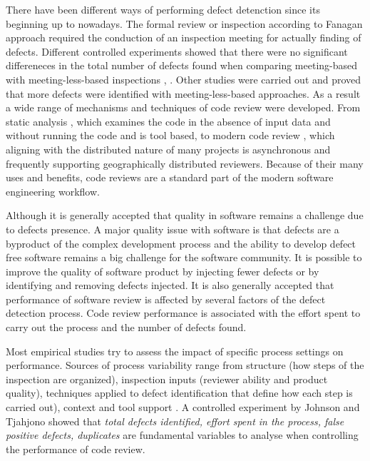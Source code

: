 \documentclass[ifip]{svmult}
\begin{document}
There have been different ways of performing defect detenction since its beginning up to nowadays. The formal review or inspection 
according to Fanagan \cite{contribution15} approach required the conduction of an inspection meeting for actually finding of 
defects. Different controlled experiments showed that there were no significant differeneces in the total number of defects found 
when comparing meeting-based with meeting-less-based inspections \cite{contribution17}, \cite{contribution18}. Other 
studies \cite{contribution19} were carried out and proved that more defects were identified with meeting-less-based approaches. 
As a result a wide range of mechanisms and techniques of code review were developed. From static analysis 
\cite{contribution3} \cite{contribution4} \cite{contribution5}, which examines the code in 
the absence of input data and without running the code and is tool based, to modern code review 
\cite{contribution6} \cite{contribution7} \cite{contribution8}, which aligning with the distributed 
nature of many projects is asynchronous and frequently supporting geographically distributed reviewers. Because of their many uses 
and benefits, code reviews are a standard part of the modern software engineering workflow.

Although it is generally accepted that quality in software remains a challenge due to defects presence. A major quality issue with 
software is that defects are a byproduct of the complex development process and the ability to develop defect free software 
remains a big challenge for the software community. 
It is possible to improve the quality of software product by injecting fewer defects or by identifying and 
removing defects injected. It is also generally accepted that performance of software review is affected by several factors of the 
defect detection process. Code review performance is associated with the effort spent to carry out the process and the number of 
defects found. 

Most empirical studies try to assess the impact of specific process settings on performance.
Sources of process variability range from structure (how steps of the inspection 
are organized), inspection inputs (reviewer ability and product quality), 
techniques applied to defect identification that define how each step is carried out), 
context and tool support \cite{contribution16}.  
A controlled experiment by Johnson and Tjahjono \cite{contribution17} showed that \textit{total defects identified, effort spent in the 
process, false positive defects, duplicates} are fundamental variables to analyse when controlling the performance of code review. 
\end{document}
